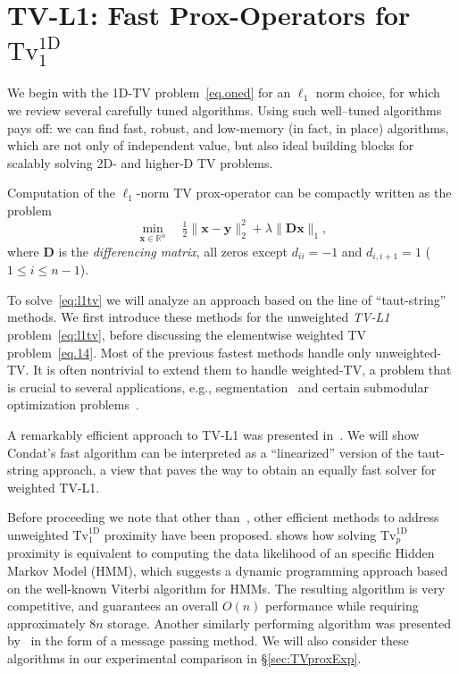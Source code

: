 \documentclass[twoside,11pt]{article}
\newcommand{\vx}{\bm{x}}       \newcommand{\vxh}{\hat{\bm{x}}}        \newcommand{\xh}{\hat{x}}    \newcommand{\vxt}{\tilde{\bm{x}}}       \newcommand{\xt}{\tilde{x}}
\newcommand{\vy}{\bm{y}}       \newcommand{\vyh}{\hat{\bm{y}}}        \newcommand{\yh}{\hat{y}}    \newcommand{\vyt}{\tilde{\bm{y}}}       \newcommand{\yt}{\tilde{y}}
\newcommand{\md}{\bm{D}}
\newcommand{\mynorm}[2]{\| {#1} \|_{#2}}
\newcommand{\norm}[2]{\mynorm{#1}{#2}}
\newcommand{\enorm}[1]{\mynorm{#1}{2}}
\newcommand{\reals}{\mathbb{R}}
\newcommand{\half}{\tfrac{1}{2}}
\newcommand{\sml}[1]{{\small #1}}
\newcommand{\fromto}[3]{\sml{$#1 \le #2 \le #3$}}
\newcommand{\tvell}{\text{Tv}}
\newcommand{\oned}{\text{1D}}
\numberwithin{equation}{section}
\numberwithin{theorem}{section}
\begin{document}
\section{TV-L1: Fast Prox-Operators for $\tvell_1^{\oned}$}
\label{sec:tvl1}
We begin with the 1D-TV problem~\eqref{eq.oned} for an $\ell_1$ norm choice, for which we review several carefully tuned algorithms. Using such well--tuned algorithms pays off: we can find fast, robust, and low-memory (in fact, in place) algorithms, which are not only of independent value, but also ideal building blocks for scalably solving 2D- and higher-D TV problems.

Computation of the $\ell_1$-norm TV prox-operator can be compactly written as the problem
\begin{equation}
  \label{eq:l1tv}
  \min_{\vx \in \reals^n}\quad\half\enorm{\vx-\vy}^2 + \lambda \norm{\md\vx}{1},
\end{equation}
where $\md$ is the \emph{differencing matrix}, all zeros except $d_{ii}=-1$ and $d_{i,i+1}=1$ (\fromto{1}{i}{n-1}).

To solve~\eqref{eq:l1tv} we will analyze an approach based on the line of ``taut-string'' methods. We first introduce these methods for the unweighted \emph{TV-L1} problem~\eqref{eq:l1tv}, before discussing the elementwise weighted TV problem~\eqref{eq.14}. Most of the previous fastest methods handle only unweighted-TV.  It is often nontrivial to extend them to handle weighted-TV, a problem that is crucial to several applications, e.g., segmentation~\citep{chaDar09} and certain submodular optimization problems~\citep{jegBac13}.

A remarkably efficient approach to TV-L1 was presented in~\citep{fastTV}. We will show Condat's fast algorithm can be interpreted as a ``linearized'' version of the taut-string approach, a view that paves the way to obtain an equally fast solver for weighted TV-L1.

Before proceeding we note that other than~\citep{fastTV}, other efficient methods to address unweighted $\tvell_1^{\oned}$ proximity have been proposed. \citet{dpTV}  shows how solving $\tvell_p^{\oned}$ proximity is equivalent to computing the data likelihood of an specific Hidden Markov Model (HMM), which suggests a dynamic programming approach based on the well-known Viterbi algorithm for HMMs. The resulting algorithm is very competitive, and guarantees an overall $O(n)$  performance while requiring approximately $8n$ storage. Another similarly performing algorithm was presented by~\citet{Kolmogorov16} in the form of a message passing method. We will also consider these algorithms in our experimental comparison in \S\ref{sec:TVproxExp}.
\end{document}
